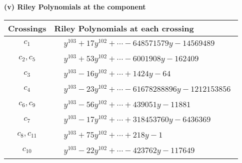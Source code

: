 \documentclass[1p]{elsarticle_modified}
\theoremstyle{definition}
\begin{document}
\newpage\renewcommand{\arraystretch}{1}
\flushleft \textbf{(v) Riley Polynomials at the component}\newline \\
\begin{tabular}{m{50pt}|m{274pt}}
Crossings & \hspace{64pt}Riley Polynomials at each crossing \\
\hline $$\begin{aligned}c_{1}\end{aligned}$$&$\begin{aligned}
&y^{103}+17 y^{102}+\cdots-648571579 y-14569489
\end{aligned}$\\
\hline $$\begin{aligned}c_{2},c_{5}\end{aligned}$$&$\begin{aligned}
&y^{103}+53 y^{102}+\cdots-6001908 y-162409
\end{aligned}$\\
\hline $$\begin{aligned}c_{3}\end{aligned}$$&$\begin{aligned}
&y^{103}-16 y^{102}+\cdots+1424 y-64
\end{aligned}$\\
\hline $$\begin{aligned}c_{4}\end{aligned}$$&$\begin{aligned}
&y^{103}-23 y^{102}+\cdots-61678288896 y-1212153856
\end{aligned}$\\
\hline $$\begin{aligned}c_{6},c_{9}\end{aligned}$$&$\begin{aligned}
&y^{103}-56 y^{102}+\cdots+439051 y-11881
\end{aligned}$\\
\hline $$\begin{aligned}c_{7}\end{aligned}$$&$\begin{aligned}
&y^{103}-17 y^{102}+\cdots+318453760 y-6436369
\end{aligned}$\\
\hline $$\begin{aligned}c_{8},c_{11}\end{aligned}$$&$\begin{aligned}
&y^{103}+75 y^{102}+\cdots+218 y-1
\end{aligned}$\\
\hline $$\begin{aligned}c_{10}\end{aligned}$$&$\begin{aligned}
&y^{103}-22 y^{102}+\cdots-423762 y-117649
\end{aligned}$\\
\hline
\end{tabular}\\~\\
\end{document}
